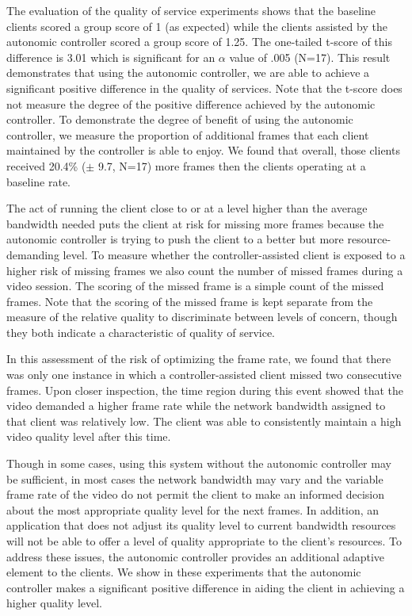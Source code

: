 \documentclass{sig-alternate}
\begin{document}
The evaluation of the quality of service experiments shows that the
baseline clients scored a group score of 1 (as expected) while the
clients assisted by the autonomic controller scored a group score of
1.25.  The one-tailed t-score of this difference is 3.01 which is
significant for an $\alpha$ value of .005 (N=17).  This result
demonstrates that using the autonomic controller, we are able to
achieve a significant positive difference in the quality of services.
Note that the t-score does not measure the degree of the positive
difference achieved by the autonomic controller.  To demonstrate the
degree of benefit of using the autonomic controller, we measure the
proportion of additional frames that each client maintained by the
controller is able to enjoy.  We found that overall, those clients
received 20.4\% ($\pm$ 9.7, N=17) more frames then the clients
operating at a baseline rate.

The act of running the client close to or at a level higher than the
average bandwidth needed puts the client at risk for missing more
frames because the autonomic controller is trying to push the client
to a better but more resource-demanding level.  To measure whether the
controller-assisted client is exposed to a higher risk of missing
frames we also count the number of missed frames during a video
session.  The scoring of the missed frame is a simple count of the
missed frames.  Note that the scoring of the missed frame is kept
separate from the measure of the relative quality to discriminate
between levels of concern, though they both indicate a characteristic
of quality of service.

In this assessment of the risk of optimizing the frame rate, we found
that there was only one instance in which a controller-assisted client
missed two consecutive frames.  Upon closer inspection, the time
region during this event showed that the video demanded a higher frame
rate while the network bandwidth assigned to that client was
relatively low.  The client was able to consistently maintain a high
video quality level after this time.


Though in some cases, using this system without the autonomic
controller may be sufficient, in most cases the network bandwidth may
vary and the variable frame rate of the video do not permit the client
to make an informed decision about the most appropriate quality level
for the next frames.  In addition, an application that does not adjust
its quality level to current bandwidth resources will not be able to
offer a level of quality appropriate to the client's resources.  To
address these issues, the autonomic controller provides an additional
adaptive element to the clients.  We show in these experiments that
the autonomic controller makes a significant positive difference in
aiding the client in achieving a higher quality level.
\end{document}

